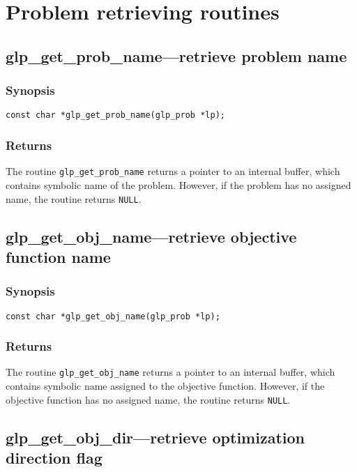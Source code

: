 \section{Problem retrieving routines}

\subsection{glp\_get\_prob\_name---retrieve problem name}

\subsubsection*{Synopsis}

\begin{verbatim}
const char *glp_get_prob_name(glp_prob *lp);
\end{verbatim}

\subsubsection*{Returns}

The routine \verb|glp_get_prob_name| returns a pointer to an internal
buffer, which contains symbolic name of the problem. However, if the
problem has no assigned name, the routine returns \verb|NULL|.

\subsection{glp\_get\_obj\_name---retrieve objective function name}

\subsubsection*{Synopsis}

\begin{verbatim}
const char *glp_get_obj_name(glp_prob *lp);
\end{verbatim}

\subsubsection*{Returns}

The routine \verb|glp_get_obj_name| returns a pointer to an internal
buffer, which contains symbolic name assigned to the objective
function. However, if the objective function has no assigned name, the
routine returns \verb|NULL|.

\subsection{glp\_get\_obj\_dir---retrieve optimization direction flag}

